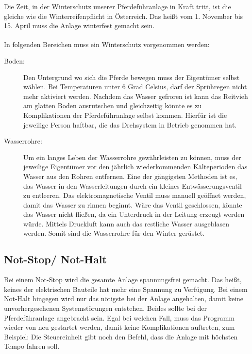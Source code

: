 Die Zeit, in der Winterschutz unserer Pferdeführanlage in Kraft tritt, ist die gleiche wie die Winterreifenpflicht in Österreich. Das heißt vom 1. November bis 15. April muss die Anlage winterfest gemacht sein. 
\\
\\
In folgenden Bereichen muss ein Winterschutz vorgenommen werden:
\begin{description}
\item[Boden:]
Den Untergrund wo sich die Pferde bewegen muss der Eigentümer selbst wählen. Bei Temperaturen unter 6 Grad Celsius, darf der Sprühregen nicht mehr aktiviert werden. Nachdem das Wasser gefroren ist kann das Reitvieh am glatten Boden ausrutschen und gleichzeitig könnte es zu Komplikationen der Pferdeführanlage selbst kommen. Hierfür ist die jeweilige Person haftbar, die das Drehsystem in Betrieb genommen hat.

\item[Wasserrohre:]

Um ein langes Leben der Wasserrohre gewährleisten zu können, muss der jeweilige Eigentümer vor den jährlich wiederkommenden Kälteperioden das Wasser aus den Rohren entfernen. Eine der gängigsten Methoden ist es, das Wasser in den Wasserleitungen durch ein kleines Entwässerungsventil zu entleeren. Das elektromagnetische Ventil muss manuell geöffnet werden, damit das Wasser zu rinnen beginnt. Wäre das Ventil geschlossen, könnte das Wasser nicht fließen, da ein Unterdruck in der Leitung erzeugt werden würde. Mittels Druckluft kann auch das restliche Wasser ausgeblasen werden. Somit sind die Wasserrohre für den Winter gerüstet.

\end{description}

\subsection{Not-Stop/ Not-Halt}
\label{sec:notstop}

Bei einem Not-Stop wird die gesamte Anlage spannungsfrei gemacht. Das heißt, keines der elektrischen Bauteile hat mehr eine Spannung zu Verfügung. Bei einem Not-Halt hingegen wird nur das nötigste bei der Anlage angehalten, damit keine unvorhergesehenen Systemstörungen entstehen. Beides sollte bei der Pferdeführanlage angebracht sein. Egal bei welchen Fall, muss das Programm wieder von neu gestartet werden, damit keine Komplikationen auftreten, zum Beispiel: Die Steuereinheit gibt noch den Befehl, dass die Anlage mit höchsten Tempo fahren soll. 

